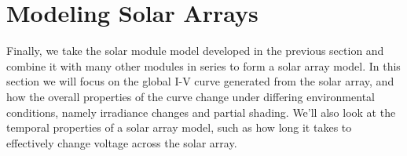 \section{Modeling Solar Arrays}\label{sec:modeling_solar_arrays}

Finally, we take the solar module model developed in the previous section and
combine it with many other modules in series to form a solar array model. In
this section we will focus on the global \ac{I-V} curve generated from the solar
array, and how the overall properties of the curve change under differing
environmental conditions, namely irradiance changes and partial shading. We'll
also look at the temporal properties of a solar array model, such as how long it
takes to effectively change voltage across the solar array.


\newpage

\newpage


